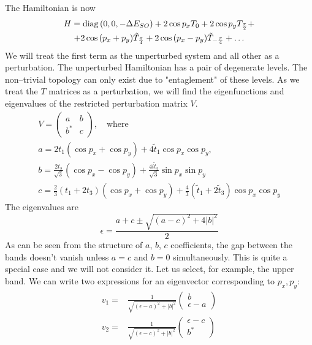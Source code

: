 The Hamiltonian is now
\begin{multline}
	H = \operatorname{diag}{(0,0,-\Delta E_{SO})} + 2\cos p_x T_0 + 2\cos p_y T_{\frac{\pi}{2}} + \\
			+ 2\cos{(p_x + p_y)} \tilde{T}_{\frac{\pi}{4}} 
			+ 2\cos{(p_x - p_y)} \tilde{T}_{-\frac{\pi}{4}} + 
			\dots
\end{multline}
We will treat the first term as the unperturbed system and all other as a perturbation. The
unperturbed Hamiltonian has a pair of degenerate levels. The non--trivial topology can only 
exist due to "entaglement" of these levels. 
As we treat the $T$ matrices as a perturbation, we will find the eigenfunctions and 
eigenvalues of the restricted perturbation matrix $V$.
\begin{equation}
	\begin{gathered}
	V =
		 \left(\begin{matrix}
			a & b \\
			b^* & c
		\end{matrix}\right), \quad \text{where} \\
		a = 2t_1(\cos{p_x} + \cos{p_y}) + 4\tilde{t}_1 \cos{p_x}\cos{p_y},\\
		b = \frac{2t_2}{\sqrt{3}}  (\cos{p_x} - \cos{p_y}) 
								+ \frac{4i\tilde{t}_2}{\sqrt{3}}\sin{p_x}\sin{p_y}\\
		c = \frac{2}{3}(t_1 + 2 t_3)(\cos{p_x} + \cos{p_y}) + 
						\frac{4}{3} (\tilde{t}_1 + 2\tilde{t}_3) \cos{p_x} \cos{p_y}
	\end{gathered}
\end{equation}
The eigenvalues are
\begin{equation}
	\epsilon = \frac{a + c \pm \sqrt{(a-c)^2 + 4|b|^2}}{2}
\end{equation}
As can be seen from the structure of $a$, $b$, $c$ coefficients, the gap between the bands 
doesn't vanish unless $a = c$ and $b = 0$ simultaneously. This is quite a special case and 
we will not consider it.
Let us select, for example, the upper band. We can write two expressions for an eigenvector
corresponding to $p_x, p_y$:
\begin{equation}
	\begin{split}
	v_1 =& \frac{1}{\sqrt{(\epsilon-a)^2+|b|^2}} 
			\left(\begin{matrix} b \\ \epsilon-a \end{matrix} \right)\\
	v_2 =& \frac{1}{\sqrt{(\epsilon-c)^2+|b|^2}} 
			\left(\begin{matrix} \epsilon-c \\ b^* \end{matrix} \right)\\
	\end{split}
\end{equation}
